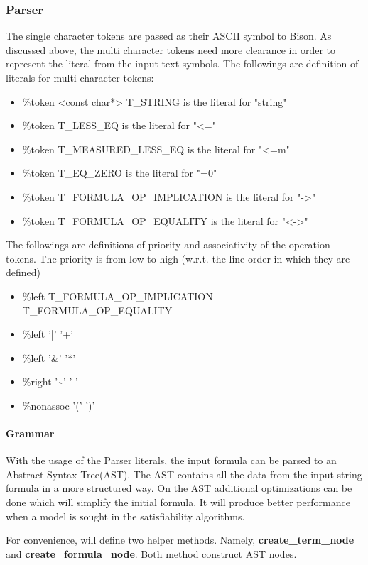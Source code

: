 \documentclass{article}
\begin{document}
	\subsubsection{Parser}
			The single character tokens are passed as their ASCII symbol to Bison. 
			As discussed above, the multi character tokens need more clearance in order to represent the literal from the input text symbols.
			The followings are definition of literals for multi character tokens:
			\begin{itemize}
				\item \%token <const char*> T\_STRING is the literal for "string"
				\item \%token T\_LESS\_EQ is the literal for "<="
				\item \%token T\_MEASURED\_LESS\_EQ is the literal for "<=m"
				\item \%token T\_EQ\_ZERO is the literal for "=0"
				\item \%token T\_FORMULA\_OP\_IMPLICATION is the literal for "->"
				\item \%token T\_FORMULA\_OP\_EQUALITY is the literal for "<->"
			\end{itemize}
			The followings are definitions of priority and associativity of the operation tokens. 
			The priority is from low to high (w.r.t. the line order in which they are defined)
			\begin{itemize}
				\item \%left T\_FORMULA\_OP\_IMPLICATION T\_FORMULA\_OP\_EQUALITY
				\item \%left '|' '+'
				\item \%left '\&' '*'
				\item \%right '\textasciitilde' '-'
				\item \%nonassoc '(' ')'
			\end{itemize}

		\paragraph{Grammar}
			With the usage of the Parser literals, the input formula can be parsed to an Abstract Syntax Tree(AST).
			The AST contains all the data from the input string formula in a more structured way.
			On the AST additional optimizations can be done which will simplify the initial formula. It will produce better performance when a model is sought in the satisfiability algorithms.

			For convenience, will define two helper methods. Namely, \textbf{create\_term\_node} and \textbf{create\_formula\_node}. Both method construct AST nodes.
\end{document}
